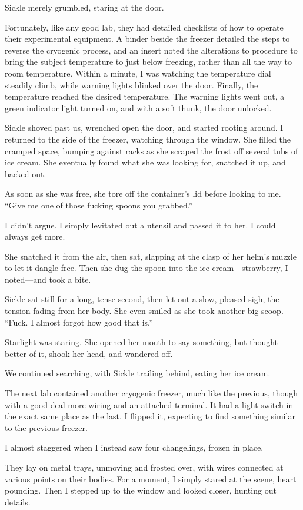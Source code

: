 Sickle merely grumbled, staring at the door.

Fortunately, like any good lab, they had detailed checklists of how to operate their experimental equipment. A binder beside the freezer detailed the steps to reverse the cryogenic process, and an insert noted the alterations to procedure to bring the subject temperature to just below freezing, rather than all the way to room temperature. Within a minute, I was watching the temperature dial steadily climb, while warning lights blinked over the door. Finally, the temperature reached the desired temperature. The warning lights went out, a green indicator light turned on, and with a soft thunk, the door unlocked.

Sickle shoved past us, wrenched open the door, and started rooting around. I returned to the side of the freezer, watching through the window. She filled the cramped space, bumping against racks as she scraped the frost off several tubs of ice cream. She eventually found what she was looking for, snatched it up, and backed out.

As soon as she was free, she tore off the container’s lid before looking to me. “Give me one of those fucking spoons you grabbed.”

I didn’t argue. I simply levitated out a utensil and passed it to her. I could always get more.

She snatched it from the air, then sat, slapping at the clasp of her helm’s muzzle to let it dangle free. Then she dug the spoon into the ice cream—strawberry, I noted—and took a bite.

Sickle sat still for a long, tense second, then let out a slow, pleased sigh, the tension fading from her body. She even smiled as she took another big scoop. “Fuck. I almost forgot how good that is.”

Starlight was staring. She opened her mouth to say something, but thought better of it, shook her head, and wandered off.

We continued searching, with Sickle trailing behind, eating her ice cream.

The next lab contained another cryogenic freezer, much like the previous, though with a good deal more wiring and an attached terminal. It had a light switch in the exact same place as the last. I flipped it, expecting to find something similar to the previous freezer.

I almost staggered when I instead saw four changelings, frozen in place.

They lay on metal trays, unmoving and frosted over, with wires connected at various points on their bodies. For a moment, I simply stared at the scene, heart pounding. Then I stepped up to the window and looked closer, hunting out details.

